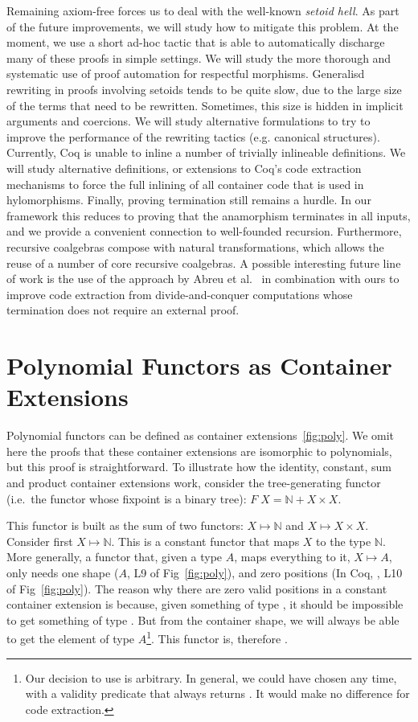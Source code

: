 \documentclass[ a4paper, UKenglish, cleveref, autoref, thm-restate]{lipics-v2021}
\begin{document}
Remaining axiom-free forces us to deal with the well-known
\emph{setoid hell}. As part of the future improvements, we will study how to
mitigate this problem. At the moment, we use a short ad-hoc tactic that is able
to automatically discharge many of these proofs in simple settings.  We will
study the more thorough and systematic use of proof automation for respectful
morphisms.  Generalisd rewriting in proofs involving setoids tends to be quite
slow, due to the large size of the terms that need to be rewritten. Sometimes,
this size is hidden in implicit arguments and coercions. We will study
alternative formulations to try to improve the performance of the rewriting
tactics (e.g.  canonical structures).  Currently, Coq is unable to inline a
number of trivially inlineable definitions.  We will study alternative
definitions, or extensions to Coq's code extraction mechanisms to force the
full inlining of all container code that is used in hylomorphisms.  Finally,
proving termination still remains a hurdle. In our framework this reduces to
proving that the anamorphism
terminates in all inputs, and we provide a convenient connection to
well-founded recursion. Furthermore, recursive coalgebras compose with natural
transformations, which allows the reuse
of a number of core recursive coalgebras. A possible interesting future line of work
is the use of the approach by Abreu et al.~\cite{AbreuDHJMS23} in combination with ours to
improve code extraction from divide-and-conquer computations whose termination
does not require an external proof. 




\appendix
\section{Polynomial Functors as Container Extensions}
\label{sec:pol-containers}
Polynomial functors can be defined as container extensions~\ref{fig:poly}. We
omit here the proofs that these container extensions are isomorphic to
polynomials, but this proof is straightforward. To illustrate how the identity,
constant, sum and product container extensions work, consider the
tree-generating functor (i.e.\ the functor whose fixpoint is a binary tree):
$F\; X = \mathbb{N} + X \times X$.

This functor is built as the sum of two functors: $X \mapsto \mathbb{N}$ and $X \mapsto
X \times X$. Consider first $X \mapsto \mathbb{N}$. This is a constant functor
that maps $X$ to the type $\mathbb{N}$. More generally, a functor that, given a
type $A$, maps everything to it, $X \mapsto A$, only needs one shape ($A$, L9
of Fig~\ref{fig:poly}), and zero positions (In Coq, ,
L10 of Fig~\ref{fig:poly}). The reason why there are zero valid positions in
a constant container extension is because, given something of type
, it should be impossible to get
something of type . But from the container shape, we will
always be able to get the element of type $A$\footnote{%
  Our decision to use  is arbitrary. In general, we
  could have chosen any time, with a validity predicate that always returns
  . It would make no difference for code extraction.
}. This functor is, therefore .
\end{document}
